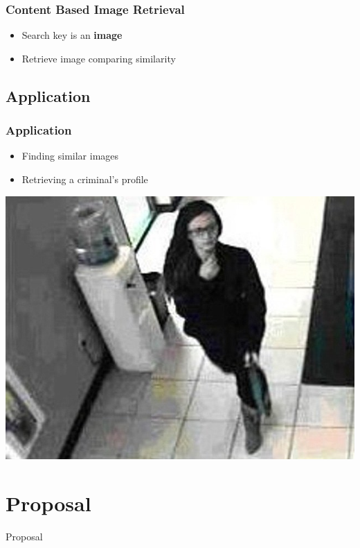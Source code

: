 \documentclass[15pt]{beamer}
\begin{document}
\begin{frame}
\frametitle{Content Based Image Retrieval}
\begin{itemize}[label=$\blacksquare$]
\item Search key is an \textbf{image}
\item Retrieve image comparing similarity
\end{itemize}
\end{frame}

\subsection{Application}
\begin{frame}
\frametitle{Application}
\begin{itemize}[label=$\blacksquare$]
\item Finding similar images
\item Retrieving a criminal's profile
\end{itemize}
\end{frame}

\begin{frame}
\includegraphics[scale=0.5,center]{criminal.jpg}
\end{frame}


\section{Proposal}
\begin{frame}
\begin{center}
\Huge Proposal
\end{center}
\end{frame}
\end{document}
